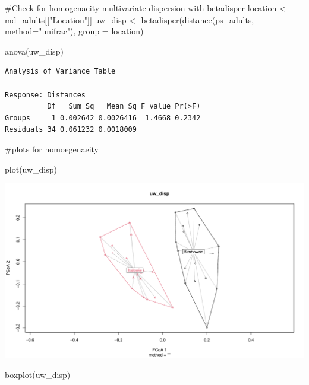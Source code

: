 \documentclass[
  letterpaper,
  DIV=11,
  numbers=noendperiod]{scrartcl}
\newenvironment{Shaded}{\begin{snugshade}}{\end{snugshade}}
\newcommand{\AttributeTok}[1]{\textcolor[rgb]{0.40,0.45,0.13}{#1}}
\newcommand{\CommentTok}[1]{\textcolor[rgb]{0.37,0.37,0.37}{#1}}
\newcommand{\FunctionTok}[1]{\textcolor[rgb]{0.28,0.35,0.67}{#1}}
\newcommand{\NormalTok}[1]{\textcolor[rgb]{0.00,0.23,0.31}{#1}}
\newcommand{\OtherTok}[1]{\textcolor[rgb]{0.00,0.23,0.31}{#1}}
\newcommand{\StringTok}[1]{\textcolor[rgb]{0.13,0.47,0.30}{#1}}
\begin{document}
\begin{Shaded}
\begin{Highlighting}[]
\CommentTok{\#Check for homogenaeity multivariate dispersion with betadisper}
\NormalTok{location }\OtherTok{\textless{}{-}}\NormalTok{ md\_adults[[}\StringTok{"Location"}\NormalTok{]]}
\NormalTok{uw\_disp }\OtherTok{\textless{}{-}} \FunctionTok{betadisper}\NormalTok{(}\FunctionTok{distance}\NormalTok{(ps\_adults, }\AttributeTok{method=}\StringTok{"unifrac"}\NormalTok{), }\AttributeTok{group =}\NormalTok{ location)}

\FunctionTok{anova}\NormalTok{(uw\_disp)}
\end{Highlighting}
\end{Shaded}

\begin{verbatim}
Analysis of Variance Table

Response: Distances
          Df   Sum Sq   Mean Sq F value Pr(>F)
Groups     1 0.002642 0.0026416  1.4668 0.2342
Residuals 34 0.061232 0.0018009               
\end{verbatim}

\begin{Shaded}
\begin{Highlighting}[]
\CommentTok{\#plots for homoegenaeity}

\FunctionTok{plot}\NormalTok{(uw\_disp)}
\end{Highlighting}
\end{Shaded}

\includegraphics{code_files/figure-pdf/unnamed-chunk-5-2.pdf}

\begin{Shaded}
\begin{Highlighting}[]
\FunctionTok{boxplot}\NormalTok{(uw\_disp)}
\end{Highlighting}
\end{Shaded}
\end{document}

